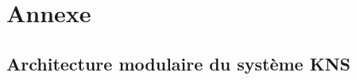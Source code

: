 \documentclass[10pt,a4paper]{report}
\begin{document}
\newpage
\section{Annexe}

\subsection{Architecture modulaire du système KNS}
	\begin{center}
	\end{center}
\end{document}
